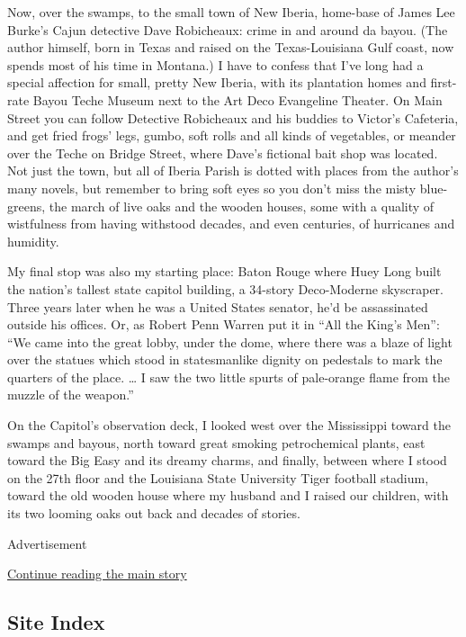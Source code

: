 Now, over the swamps, to the small town of New Iberia, home-base of
James Lee Burke's Cajun detective Dave Robicheaux: crime in and around
da bayou. (The author himself, born in Texas and raised on the
Texas-Louisiana Gulf coast, now spends most of his time in Montana.) I
have to confess that I've long had a special affection for small, pretty
New Iberia, with its plantation homes and first-rate Bayou Teche Museum
next to the Art Deco Evangeline Theater. On Main Street you can follow
Detective Robicheaux and his buddies to Victor's Cafeteria, and get
fried frogs' legs, gumbo, soft rolls and all kinds of vegetables, or
meander over the Teche on Bridge Street, where Dave's fictional bait
shop was located. Not just the town, but all of Iberia Parish is dotted
with places from the author's many novels, but remember to bring soft
eyes so you don't miss the misty blue-greens, the march of live oaks and
the wooden houses, some with a quality of wistfulness from having
withstood decades, and even centuries, of hurricanes and humidity.

My final stop was also my starting place: Baton Rouge where Huey Long
built the nation's tallest state capitol building, a 34-story
Deco-Moderne skyscraper. Three years later when he was a United States
senator, he'd be assassinated outside his offices. Or, as Robert Penn
Warren put it in ``All the King's Men'': ``We came into the great lobby,
under the dome, where there was a blaze of light over the statues which
stood in statesmanlike dignity on pedestals to mark the quarters of the
place. \ldots{} I saw the two little spurts of pale-orange flame from
the muzzle of the weapon.''

On the Capitol's observation deck, I looked west over the Mississippi
toward the swamps and bayous, north toward great smoking petrochemical
plants, east toward the Big Easy and its dreamy charms, and finally,
between where I stood on the 27th floor and the Louisiana State
University Tiger football stadium, toward the old wooden house where my
husband and I raised our children, with its two looming oaks out back
and decades of stories.

Advertisement

\protect\hyperlink{after-bottom}{Continue reading the main story}

\hypertarget{site-index}{%
\subsection{Site Index}\label{site-index}}

